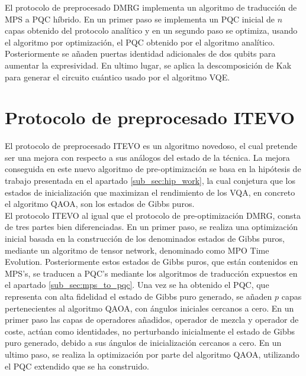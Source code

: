El protocolo de preprocesado DMRG implementa un algoritmo de traducción de MPS a \mbox{PQC} híbrido. En un primer paso se implementa un \mbox{PQC} inicial de $n$ capas obtenido del protocolo analítico y en un segundo paso se optimiza, usando el algoritmo por optimización, el \mbox{PQC} obtenido por el algoritmo analítico. Posteriormente se añaden puertas identidad adicionales de dos qubits para aumentar la expresividad. En ultimo lugar, se aplica la descomposición de Kak para generar el circuito cuántico usado por el algoritmo VQE. \\


\newpage

\section{Protocolo de preprocesado ITEVO}
\label{sub_sec:i_tevo}

El protocolo de preprocesado ITEVO es un algoritmo novedoso, el cual pretende ser una mejora con respecto a sus análogos del estado de la técnica. La mejora conseguida en este nuevo algoritmo de pre-optimización se basa en la hipótesis de trabajo presentada en el apartado \ref{sub_sec:hip_work}, la cual conjetura que los estados de inicialización que maximizan el rendimiento de los VQA, en concreto el algoritmo QAOA, son los estados de Gibbs puros. \\

El protocolo ITEVO al igual que el protocolo de pre-optimización DMRG, consta de tres partes bien diferenciadas. En un primer paso, se realiza una optimización inicial basada en la construcción de los denominados estados de Gibbs puros, mediante un algoritmo de tensor network, denominado como MPO Time Evolution. Posteriormente estos estados de Gibbs puros, que están contenidos en MPS's, se traducen a \mbox{PQC's} mediante los algoritmos de traducción expuestos en el apartado \ref{sub_sec:mps_to_pqc}. Una vez se ha obtenido el \mbox{PQC}, que representa con alta fidelidad el estado de Gibbs puro generado, se añaden $p$ capas pertenecientes al algoritmo QAOA, con ángulos iniciales cercanos a cero. En un primer paso las capas de operadores añadidos, operador de mezcla y operador de coste, actúan como identidades, no perturbando inicialmente el estado de Gibbs puro generado, debido a sus ángulos de inicialización cercanos a cero. En un ultimo paso, se realiza la optimización por parte del algoritmo QAOA, utilizando el \mbox{PQC} extendido que se ha construido. \\

